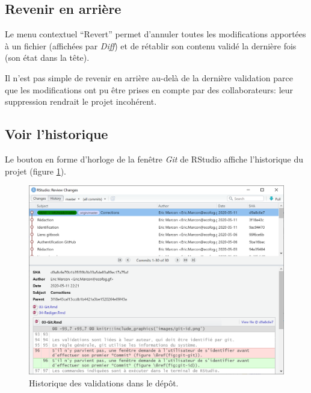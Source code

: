 \documentclass[
  12pt,
  french,
  a4paper,
  extrafontsizes,onecolumn,openright
  ]{memoir}
\begin{document}
\normalsize

\hypertarget{revenir-en-arriuxe8re}{%
\subsection{Revenir en arrière}\label{revenir-en-arriuxe8re}}

Le menu contextuel \enquote{Revert} permet d'annuler toutes les modifications apportées à un fichier (affichées par \emph{Diff}) et de rétablir son contenu validé la dernière fois (son état dans la tête).

Il n'est pas simple de revenir en arrière au-delà de la dernière validation parce que les modifications ont pu être prises en compte par des collaborateurs: leur suppression rendrait le projet incohérent.

\hypertarget{voir-lhistorique}{%
\subsection{Voir l'historique}\label{voir-lhistorique}}

Le bouton en forme d'horloge de la fenêtre \emph{Git} de RStudio affiche l'historique du projet (figure \ref{fig:git-historique}).



\scriptsize

\begin{figure}

{\centering \includegraphics[width=0.8\linewidth]{images/git-historique} 

}

\caption{Historique des validations dans le dépôt.}\label{fig:git-historique}
\end{figure}

\normalsize
\end{document}
